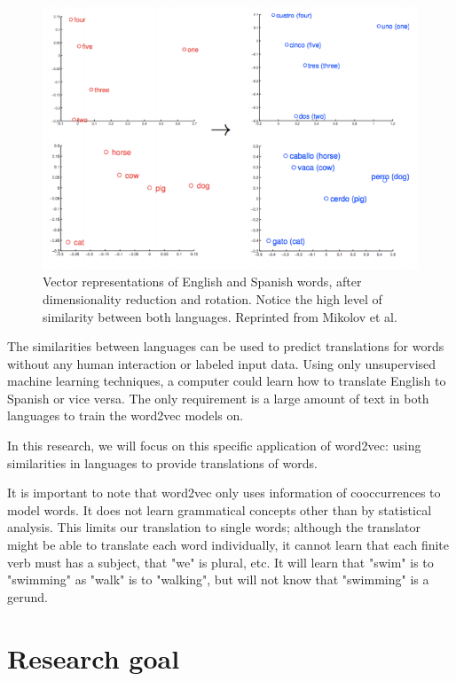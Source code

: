 \begin{figure}[ht!]
  \centering \includegraphics[width=\linewidth]{images/english_spanish}
  \caption{Vector representations of English and Spanish words, after dimensionality reduction and rotation. Notice the high level of similarity between both languages. Reprinted from Mikolov et al.~\cite{mikolov2013exploiting}}
  \label{fig:english_spanish}
\end{figure}

The similarities between languages can be used to predict translations for words without any human interaction or labeled input data. Using only unsupervised machine learning techniques, a computer could learn how to translate English to Spanish or vice versa. The only requirement is a large amount of text in both languages to train the word2vec models on.

In this research, we will focus on this specific application of word2vec: using similarities in languages to provide translations of words.

It is important to note that word2vec only uses information of cooccurrences to model words. It does not learn grammatical concepts other than by statistical analysis. This limits our translation to single words; although the translator might be able to translate each word individually, it cannot learn that each finite verb must has a subject, that "we" is plural, etc. It will learn that "swim" is to "swimming" as "walk" is to "walking", but will not know that "swimming" is a gerund.

\section{Research goal}
\lipsum[66]


